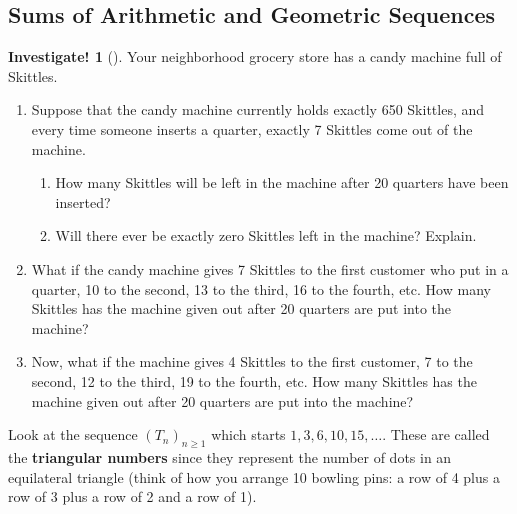 \documentclass[10pt,]{book}
\newcommand{\terminology}[1]{\textbf{#1}}
\theoremstyle{plain}
\theoremstyle{definition}
\theoremstyle{definition}
\theoremstyle{definition}
\newtheorem{investigation}[project]{Investigate!}
\theoremstyle{definition}
\numberwithin{equation}{chapter}
\begin{document}
\subsection[{Sums of Arithmetic and Geometric Sequences}]{Sums of Arithmetic and Geometric Sequences}\label{subsection-1}
\begin{investigation}[]\label{investigation-5}
\hypertarget{p-127}{}%
Your neighborhood grocery store has a candy machine full of Skittles. %
\begin{enumerate}
\item\hypertarget{li-86}{}\hypertarget{p-128}{}%
Suppose that the candy machine currently holds exactly 650 Skittles, and every time someone inserts a quarter, exactly 7 Skittles come out of the machine. %
\begin{enumerate}
\item\hypertarget{li-87}{}\hypertarget{p-129}{}%
How many Skittles will be left in the machine after 20 quarters have been inserted?%
\item\hypertarget{li-88}{}\hypertarget{p-130}{}%
Will there ever be exactly zero Skittles left in the machine? Explain.%
\end{enumerate}
%
\item\hypertarget{li-89}{}\hypertarget{p-131}{}%
What if the candy machine gives 7 Skittles to the first customer who put in a quarter, 10 to the second, 13 to the third, 16 to the fourth, etc. How many Skittles has the machine given out after 20 quarters are put into the machine?%
\item\hypertarget{li-90}{}\hypertarget{p-132}{}%
Now, what if the machine gives 4 Skittles to the first customer, 7 to the second, 12 to the third, 19 to the fourth, etc. How many Skittles has the machine given out after 20 quarters are put into the machine?%
\end{enumerate}
%
\end{investigation}
\hypertarget{p-133}{}%
Look at the sequence \((T_n)_{n\ge 1}\) which starts \(1, 3, 6, 10, 15,\ldots\). These are called the \terminology{triangular numbers} since they represent the number of dots in an equilateral triangle (think of how you arrange 10 bowling pins: a row of 4 plus a row of 3 plus a row of 2 and a row of 1).%
\end{document}
